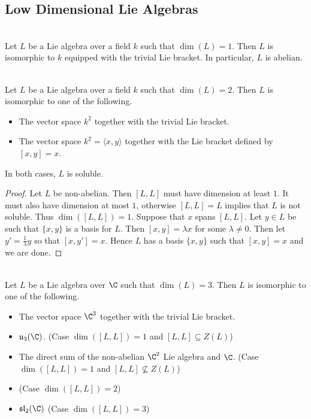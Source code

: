 \documentclass[a4paper]{article}
\begin{document}
\subsection{Low Dimensional Lie Algebras}
\begin{prp}{}{} \\Let $L$ be a Lie algebra over a field $k$ such that $\dim(L)=1$. Then $L$ is isomorphic to $k$ equipped with the trivial Lie bracket. In particular, $L$ is abelian. 
\end{prp}

\begin{prp}{}{} \\Let $L$ be a Lie algebra over a field $k$ such that $\dim(L)=2$. Then $L$ is isomorphic to one of the following. 
\begin{itemize}
\item The vector space $k^2$ together with the trivial Lie bracket. 
\item The vector space $k^2=\langle x,y\rangle$ together with the Lie bracket defined by $[x,y]=x$. 
\end{itemize} 
In both cases, $L$ is soluble. 
\begin{proof}
Let $L$ be non-abelian. Then $[L,L]$ must have dimension at least $1$. It must also have dimension at most $1$, otherwise $[L,L]=L$ implies that $L$ is not soluble. Thus $\dim([L,L])=1$. Suppose that $x$ spans $[L,L]$. Let $y\in L$ be such that $\{x,y\}$ is a basis for $L$. Then $[x,y]=\lambda x$ for some $\lambda\neq 0$. Then let $y'=\frac{1}{\lambda}y$ so that $[x,y']=x$. Hence $L$ has a basis $\{x,y\}$ such that $[x,y]=x$ and we are done. 
\end{proof}
\end{prp}

\begin{prp}{}{} \\Let $L$ be a Lie algebra over $\C$ such that $\dim(L)=3$. Then $L$ is isomorphic to one of the following. 
\begin{itemize}
\item The vector space $\C^3$ together with the trivial Lie bracket. 
\item $\mathfrak{u}_3(\C)$. (Case $\dim([L,L])=1$ and $[L,L]\subseteq Z(L)$)
\item The direct sum of the non-abelian $\C^2$ Lie algebra and $\C$. (Case $\dim([L,L])=1$ and $[L,L]\not\subseteq Z(L)$)
\item (Case $\dim([L,L])=2$)
\item $\mathfrak{sl}_2(\C)$ (Case $\dim([L,L])=3$)
\end{itemize}
\end{prp}
\end{document}
